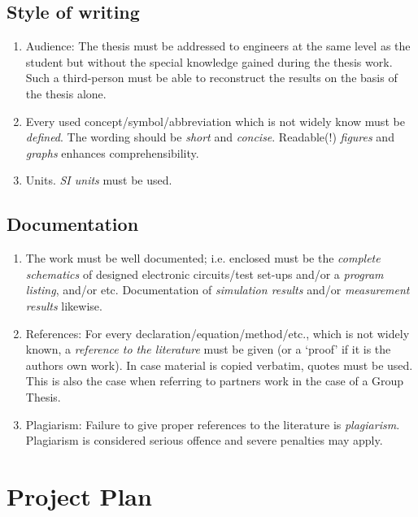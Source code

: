 \section{Style of writing}

\begin{enumerate}

\item Audience:
The thesis must be addressed to engineers at the same level as the
student but without the special knowledge gained during the thesis work.
Such a third-person must be able to reconstruct the results on the basis
of the thesis alone.

\item
Every used concept/symbol/abbreviation which is not widely know must be \emph{defined}.
The wording should be \emph{short} and \emph{concise}.  
Readable(!) \emph{figures} and \emph{graphs} enhances comprehensibility.

\item Units.
\emph{SI units} must be used.
\end{enumerate}

\section{Documentation}

\begin{enumerate}
\item
The work must be well documented; i.e. enclosed must be the \emph{complete
schematics} of designed electronic circuits/test set-ups and/or a
\emph{program listing}, and/or etc.
Documentation of \emph{simulation results} and/or \emph{measurement
results} likewise.
\item References:
For every declaration/equation/method/etc., which is not widely known,
a \emph{reference to the literature} must be given (or a `proof' if it is
the authors own work).
In case material is copied verbatim, quotes must be used.
This is also the case when referring to partners
work in the case of a Group Thesis.

\item Plagiarism:
Failure to give proper references to the literature is \emph{plagiarism}.
Plagiarism is considered serious offence and severe penalties may apply.

\end{enumerate}

\chapter{Project Plan}\label{ch:style}





